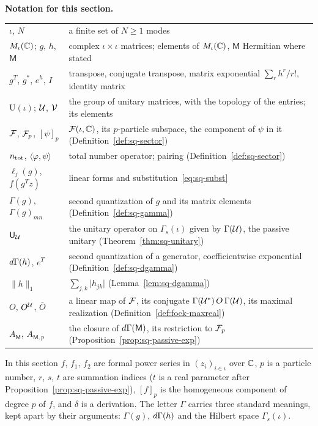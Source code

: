 \begin{vetdenv}
\medskip
\noindent\textbf{Notation for this section.}
\begin{center}
\begin{tabular}{@{}L{0.3\textwidth}L{0.64\textwidth}@{}}
$\iota$, $N$ & a finite set of $N\ge1$ modes\\
$M_\iota(\mathbb C)$; $g$, $h$, $\mathsf M$ & complex $\iota\times\iota$ matrices; elements of $M_\iota(\mathbb C)$, $\mathsf M$
Hermitian where stated\\
$g^T$, $g^*$, $e^h$, $I$ & transpose, conjugate transpose, matrix exponential $\sum_rh^r/r!$, identity matrix\\
$\mathrm U(\iota)$; $\mathcal U$, $\mathcal V$ & the group of unitary matrices, with the topology of the entries; its elements\\
$\mathcal F$, $\mathcal F_p$, $[\psi]_p$ & $\mathcal F(\iota,\mathbb C)$, its $p$-particle subspace, the component of $\psi$ in it
(Definition~\ref{def:sq-sector})\\
$n_{\mathrm{tot}}$, $\langle\varphi,\psi\rangle$ & total number operator; pairing (Definition~\ref{def:sq-sector})\\
$\ell_j(g)$, $f(g^Tz)$ & linear forms and substitution~\eqref{eq:sq-subst}\\
$\Gamma(g)$, $\Gamma(g)_{mn}$ & second quantization of $g$ and its matrix elements (Definition~\ref{def:sq-gamma})\\
$\mathsf U_\mathcal U$ & the unitary operator on $\Gamma_s(\iota)$ given by $\Gamma(\mathcal U)$, the passive unitary
(Theorem~\ref{thm:sq-unitary})\\
$d\Gamma(h)$, $e^T$ & second quantization of a generator, coefficientwise exponential (Definition~\ref{def:sq-dgamma})\\
$\lVert h\rVert_1$ & $\sum_{j,k}\lvert h_{jk}\rvert$ (Lemma~\ref{lem:sq-dgamma})\\
$O$, $O^\mathcal U$, $\bar O$ & a linear map of $\mathcal F$, its conjugate $\Gamma(\mathcal U^*)\,O\,\Gamma(\mathcal U)$, its maximal
realization (Definition~\ref{def:fock-maxreal})\\
$A_{\mathsf M}$, $A_{\mathsf M,p}$ & the closure of $d\Gamma(\mathsf M)$, its restriction to $\mathcal F_p$
(Proposition~\ref{prop:sq-passive-exp})\\
\end{tabular}
\end{center}
In this section $f$, $f_1$, $f_2$ are formal power series in $(z_i)_{i\in\iota}$ over $\mathbb C$, $p$ is a particle number,
$r$, $s$, $t$ are summation indices ($t$ is a real parameter after Proposition~\ref{prop:sq-passive-exp}), $[f]_p$ is
the homogeneous component of degree $p$ of $f$, and $\delta$ is a derivation. The letter $\Gamma$ carries three standard
meanings, kept apart by their arguments: $\Gamma(g)$, $d\Gamma(h)$ and the Hilbert space $\Gamma_s(\iota)$.


\end{vetdenv}
